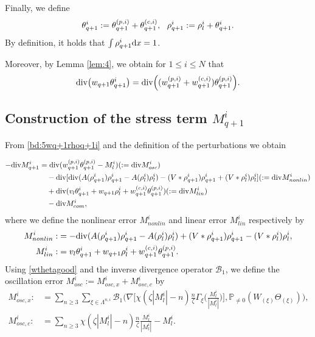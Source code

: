 \documentclass[UTF-8,reqno]{amsart}
\numberwithin{equation}{section}
\theoremstyle{definition}
\def\[{{\Big[}}
\def\]{{\Big]}}
\def\({{\Big(}}
\def\){{\Big)}}
\def\dif{{\mathord{{\rm d}}}}
\def\geq{\geqslant}
\def\leq{\leqslant}
\def\div{\mathord{{\rm div}}}
\def\[{{\Big[}}
\def\]{{\Big]}}
\def\({{\Big(}}
\def\){{\Big)}}
\def\dif{{\mathord{{\rm d}}}}
\def\geq{\geqslant}
\def\leq{\leqslant}
\def\div{\mathord{{\rm div}}}
\begin{document}
Finally, we define
\begin{align}
\theta _{q+1}^i:=\theta_{q+1}^{(p,i)}+\theta_{q+1}^{(c,i)},
\ \ 
  \rho^i_{q+1}:=  \rho^i_l+\theta^i _{q+1}.\notag
\end{align}
  By  definition, it  holds that $\int  \rho^i_{q+1}\dif x=1$.



Moreover, by Lemma \ref{lem:4}, we obtain for
$
1\leq i\leq N 
$
that
\begin{align}
\div\bigl(
w_{q+1}\theta_{q+1}^i
\bigr)
=
\div\(
(w_{q+1}^{(p,i)}+w_{q+1}^{(c,i)})
\theta_{q+1}^{(p,i)}
\).
\label{bd:5wq+1rhoq+1i}
\end{align}

 

\subsection{Construction of the stress term $M^i_{q+1}$}\label{sec:5defmq+1}
From  \eqref{bd:5wq+1rhoq+1i}  and the definition of the perturbations 
we obtain

\begin{align*}
 -\div M^i_{q+1}&=\div (w_{q+1}^{(p,i)}\theta_{q+1}^{(p,i)}-M^i_l)(:=\div M^i_{osc})\\
 &\quad-\div[ \div( A(\rho^{i}_{q+1})\rho^{i}_{q+1}-A(\rho^{i}_{l}) \rho^{i}_{l})-(V*\rho_{q+1}^i)\rho_{q+1}^i+(V*\rho_{l}^i)\rho_{l}^i] (:=\div M^i_{nonlin})\notag\\ 
 &\quad+\div(v_l\theta _{q+1}^i+w_{q+1}  \rho^i_l+w_{q+1}^{(c,i)}\theta_{q+1}^{(p,i)})(:=\div M^i_{lin})\\
 &\quad -\div M^i_{com},
\end{align*}
where we  define  the  nonlinear error $ M^i_{nonlin}$ and linear error $M^i_{lin}$ respectively by 
\begin{align*}
M^i_{nonlin}:&=-\div(  A(\rho^i_{q+1} )   \rho^i_{q+1}- A(\rho^i_{l} ) \rho^i_{l}) +(V*\rho_{q+1}^i)\rho_{q+1}^i-(V*\rho_{l}^i)\rho_{l}^i,\\
M^i_{lin}:&=v_l\theta^i _{q+1}+w_{q+1}  \rho^i_l+w_{q+1}^{(c,i)}\theta_{q+1}^{(p,i)}.
\end{align*}  
Using \eqref{wthetagood} and the inverse divergence operator  $\mathcal{B}_1$, we  define  the  oscillation error $M^i_{osc}:=M^i_{osc,x}+M^i_{osc,c}$  by
\begin{align*} M^i_{osc,x}:&=\sum_{n\geq3}\sum_{\xi\in\Lambda^{n,i}}\mathcal{B}_1\(\nabla\[\chi(\zeta |M^i_l|-n)\frac{n}{\zeta }\Gamma_{\xi}\(\frac{M^i_l}{|M^i_l|}\)\],\mathbb{P}_{\neq0}(W_{ (\xi)}\Theta_{ (\xi)})\),\\
   M^i_{osc,c}:&=\sum_{n\geq3}\chi(\zeta |M^i_l|-n)\frac{n}{\zeta }\frac{M^i_l}{|M^i_l|}- M^i_l.
\end{align*}
 
\end{document}
